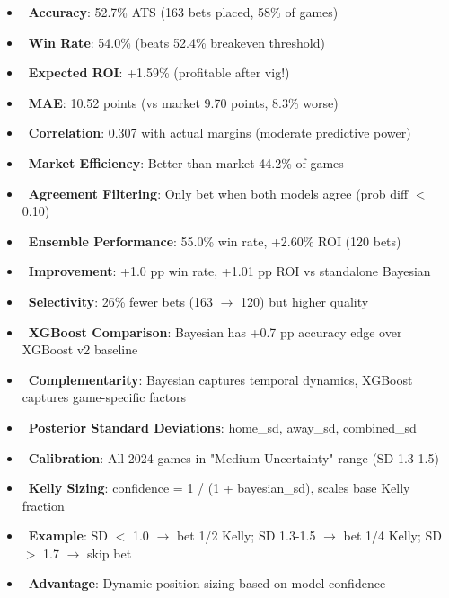 \begin{itemize}
  \item \done\ \textbf{Accuracy}: 52.7\% ATS (163 bets placed, 58\% of games)
  \item \done\ \textbf{Win Rate}: 54.0\% (beats 52.4\% breakeven threshold)
  \item \done\ \textbf{Expected ROI}: +1.59\% (profitable after vig!)
  \item \done\ \textbf{MAE}: 10.52 points (vs market 9.70 points, 8.3\% worse)
  \item \done\ \textbf{Correlation}: 0.307 with actual margins (moderate predictive power)
  \item \done\ \textbf{Market Efficiency}: Better than market 44.2\% of games
\end{itemize}

\begin{itemize}
  \item \done\ \textbf{Agreement Filtering}: Only bet when both models agree (prob diff $<$ 0.10)
  \item \done\ \textbf{Ensemble Performance}: 55.0\% win rate, +2.60\% ROI (120 bets)
  \item \done\ \textbf{Improvement}: +1.0 pp win rate, +1.01 pp ROI vs standalone Bayesian
  \item \done\ \textbf{Selectivity}: 26\% fewer bets (163 $\to$ 120) but higher quality
  \item \done\ \textbf{XGBoost Comparison}: Bayesian has +0.7 pp accuracy edge over XGBoost v2 baseline
  \item \done\ \textbf{Complementarity}: Bayesian captures temporal dynamics, XGBoost captures game-specific factors
\end{itemize}

\begin{itemize}
  \item \done\ \textbf{Posterior Standard Deviations}: home\_sd, away\_sd, combined\_sd
  \item \done\ \textbf{Calibration}: All 2024 games in "Medium Uncertainty" range (SD 1.3-1.5)
  \item \done\ \textbf{Kelly Sizing}: confidence = 1 / (1 + bayesian\_sd), scales base Kelly fraction
  \item \done\ \textbf{Example}: SD $<$ 1.0 $\to$ bet 1/2 Kelly; SD 1.3-1.5 $\to$ bet 1/4 Kelly; SD $>$ 1.7 $\to$ skip bet
  \item \done\ \textbf{Advantage}: Dynamic position sizing based on model confidence
\end{itemize}

